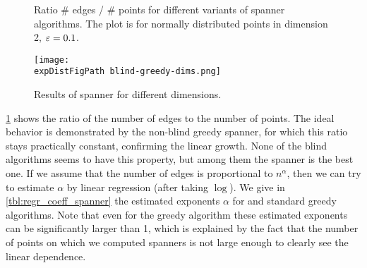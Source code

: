 \begin{figure}[!htbp]
            \caption{Ratio \# edges / \# points for different variants of spanner 
            algorithms. The plot is for normally distributed points
            in dimension 2, $\varepsilon = 0.1$.}
            \label{fig:spanner_ratio}
\end{figure}

\begin{figure}[ht!]
    \begin{centering}
    \texttt{[image: \\expDistFigPath blind-greedy-dims.png]}
    \caption{Results of \bgrdy spanner for different dimensions.}
    \label{fig:blind_greedy_dimensions}
    \end{centering}
\end{figure}


\cref{fig:spanner_ratio} shows the ratio of the number of edges to the number of points.
The ideal behavior is demonstrated by the non-blind greedy spanner,
for which this ratio stays practically constant, confirming the linear growth.
None of the blind algorithms seems to have this property, but among them
the \bgrdy spanner is the best one. If we assume that the number of edges
is proportional to $n^\alpha$, then we can try to estimate $\alpha$ by 
linear regression (after taking $\log$).  We give in \cref{tbl:regr_coeff_spanner}
the estimated exponents $\alpha$ for \bgrdy and standard
greedy algorithms. Note that even for the greedy algorithm these estimated
exponents can be significantly larger than 1,
which is explained by the fact that the number of points
on which we computed spanners is not large enough to clearly see
the linear dependence.


